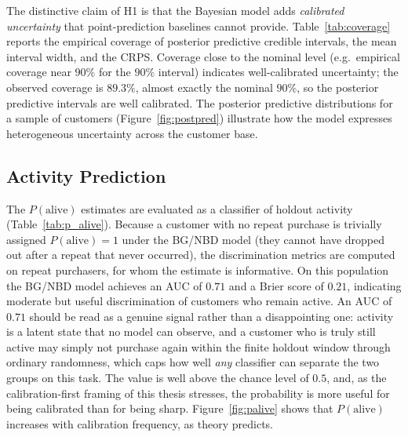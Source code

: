 The distinctive claim of H1 is that the Bayesian model adds \emph{calibrated uncertainty} that point-prediction baselines cannot provide. Table~\ref{tab:coverage} reports the empirical coverage of posterior predictive credible intervals, the mean interval width, and the CRPS. Coverage close to the nominal level (e.g.\ empirical coverage near $90\%$ for the $90\%$ interval) indicates well-calibrated uncertainty; the observed coverage is $89.3\%$, almost exactly the nominal $90\%$, so the posterior predictive intervals are well calibrated. The posterior predictive distributions for a sample of customers (Figure~\ref{fig:postpred}) illustrate how the model expresses heterogeneous uncertainty across the customer base.



\subsection{Activity Prediction}
\label{sec:results-palive}

The $P(\text{alive})$ estimates are evaluated as a classifier of holdout activity (Table~\ref{tab:p_alive}). Because a customer with no repeat purchase is trivially assigned $P(\text{alive}) = 1$ under the BG/NBD model (they cannot have dropped out after a repeat that never occurred), the discrimination metrics are computed on repeat purchasers, for whom the estimate is informative. On this population the BG/NBD model achieves an AUC of $0.71$ and a Brier score of $0.21$, indicating moderate but useful discrimination of customers who remain active. An AUC of $0.71$ should be read as a genuine signal rather than a disappointing one: activity is a latent state that no model can observe, and a customer who is truly still active may simply not purchase again within the finite holdout window through ordinary randomness, which caps how well \emph{any} classifier can separate the two groups on this task. The value is well above the chance level of $0.5$, and, as the calibration-first framing of this thesis stresses, the probability is more useful for being calibrated than for being sharp. Figure~\ref{fig:palive} shows that $P(\text{alive})$ increases with calibration frequency, as theory predicts.

